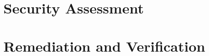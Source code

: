 \documentclass[12pt, a4paper, oneside]{report}
\begin{document}
\part{Security Assessment}








\part{Remediation and Verification}



\appendix




\end{document}
